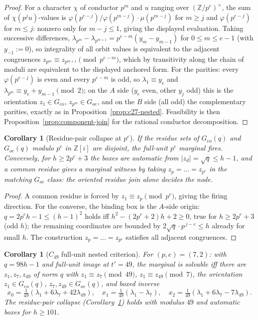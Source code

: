 \documentclass[11pt]{article}
\theoremstyle{plain}
\newtheorem{corollary}[theorem]{Corollary}
\theoremstyle{definition}
\theoremstyle{remark}
\newcommand{\Z}{\mathbb Z}
\begin{document}
\begin{proof}
For a character $\chi$ of conductor $p^m$ and $u$ ranging over
$(\Z/p^e)^\times$, the sum of $\chi(p^ju)$-values is
$\varphi(p^{e-j})/\varphi(p^{m-j})\cdot\mu(p^{m-j})$ for $m\ge j$ and
$\varphi(p^{e-j})$ for $m\le j$: nonzero only for $m-j\le1$, giving the
displayed evaluation.  Taking successive differences,
$\lambda_{p^m}-\lambda_{p^{m+1}}=p^{e-m}(y_m-y_{m-1})$ for
$0\le m\le e-1$ (with $y_{-1}:=0$), so integrality of all orbit
values is equivalent to the adjacent congruences
$z_{p^m}\equiv z_{p^{m+1}}\pmod{p^{e-m}}$, which by transitivity along
the chain of moduli are equivalent to the displayed anchored form.  For
the parities: every $\varphi(p^{e-j})$ is even and every $p^{e-m}$ is
odd, so $\lambda_1\equiv y_e$ and $\lambda_{p^m}\equiv y_e+y_{m-1}
\pmod2$; on the $A$ side ($y_e$ even, other $y_j$ odd) this is the
orientation $z_1\in G_{eo}$, $z_{p^m}\in G_{oe}$, and on the $B$ side
(all odd) the complementary parities, exactly as in
Proposition~\ref{prop:c27-nested}.  Feasibility is then
Proposition~\ref{prop:component-join} for the rational conductor
decomposition.
\end{proof}

\begin{corollary}[Residue-pair collapse at $p^e$]\label{cor:pe-residue-pair}
If the residue sets of $G_{eo}(q)$ and $G_{oe}(q)$ modulo $p^e$ in
$\Z[i]$ are disjoint, the full-unit $p^e$ marginal fires.  Conversely,
for $h\ge2p^e+3$ the boxes are automatic from $|z_d|=\sqrt q\le h-1$,
and a common residue gives a marginal witness by taking
$z_p=\dots=z_{p^e}$ in the matching $G_{oe}$ class: the oriented
residue join alone decides the node.
\end{corollary}

\begin{proof}
A common residue is forced by $z_1\equiv z_p\pmod{p^e}$, giving the
firing direction.  For the converse, the binding box is the $A$-side
origin: $q=2p^eh-1\le(h-1)^2$ holds iff $h^2-(2p^e+2)h+2\ge0$, true
for $h\ge2p^e+3$ (odd $h$); the remaining coordinates are bounded by
$2\sqrt q\cdot p^{\,j-e}\le h$ already for small $h$.  The construction
$z_p=\dots=z_{p^e}$ satisfies all adjacent congruences.
\end{proof}

\begin{corollary}[$C_{49}$ full-unit nested criterion]\label{cor:c49-nested}
For $(p,e)=(7,2)$: with $q=98h-1$ and full-unit image at $t'=49$, the
marginal is solvable iff there are $z_1,z_7,z_{49}$ of norm $q$ with
$z_1\equiv z_7\pmod{49}$, $z_1\equiv z_{49}\pmod7$, the orientation
$z_1\in G_{eo}(q)$, $z_7,z_{49}\in G_{oe}(q)$, and boxed inverse
\[
  x_0=\tfrac1{49}(\lambda_1+6\lambda_7+42\lambda_{49}),\quad
  x_1=\tfrac1{49}(\lambda_1-\lambda_7),\quad
  x_2=\tfrac1{49}(\lambda_1+6\lambda_7-7\lambda_{49}).
\]
The residue-pair collapse (Corollary~\ref{cor:pe-residue-pair}) holds
with modulus $49$ and automatic boxes for $h\ge101$.
\end{corollary}
\end{document}
